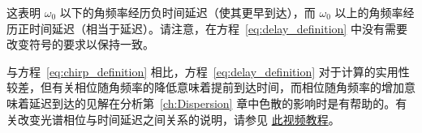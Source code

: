 这表明 $\omega_0$ 以下的角频率经历负时间延迟（使其更早到达），而 $\omega_0$ 以上的角频率经历正时间延迟（相当于延迟）。请注意，在方程~\ref{eq:delay_definition} 中没有需要改变符号的要求以保持一致。

与方程~\ref{eq:chirp_definition} 相比，方程~\ref{eq:delay_definition} 对于计算的实用性较差，但有关相位随角频率的降低意味着提前到达时间，而相位随角频率的增加意味着延迟到达的见解在分析第~\ref{ch:Dispersion} 章中色散的影响时是有帮助的。有关改变光谱相位与时间延迟之间关系的说明，请参见 \href{https://youtu.be/E3S0BQiy3p8}{此视频教程}。





